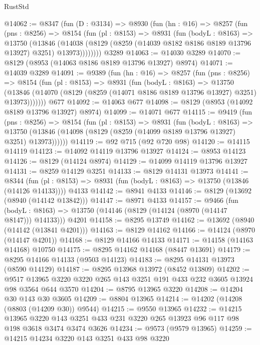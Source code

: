 \begin{lexlean}{RustStd}
\begin{coremodule}
@14062 := @8347
    (fun (D : @3134) =>
    @8930
      (fun (hn : @16) =>
      @8257
        (fun (pns : @8256) =>
        @8154
          (fun (pl : @8153) =>
          @8931
            (fun (bodyL : @8163) =>
            @13750
              (@13846
                (@14038 (@8129 (@8259 (@14039 @8182 @8186 @8189 @13796 @13927) @3251) @13973))))))))
    @3289
@14063 := @14030 @3289
@14070 := @8129 (@8953 (@14063 @8186 @8189 @13796 @13927) @8974)
@14071 := @14039 @3289
@14091 := @9389
    (fun (hn : @16) =>
    @8257
      (fun (pns : @8256) =>
      @8154
        (fun (pl : @8153) =>
        @8931
          (fun (bodyL : @8163) =>
          @13750
            (@13846 (@14070 (@8129 (@8259 (@14071 @8186 @8189 @13796 @13927) @3251) @13973)))))))
    @677
@14092 := @14063 @677
@14098 := @8129 (@8953 (@14092 @8189 @13796 @13927) @8974)
@14099 := @14071 @677
@14115 := @9419
    (fun (pns : @8256) =>
    @8154
      (fun (pl : @8153) =>
      @8931
        (fun (bodyL : @8163) =>
        @13750 (@13846 (@14098 (@8129 (@8259 (@14099 @8189 @13796 @13927) @3251) @13973))))))
@14119 := @92 @715 (@92 @720 @98)
@14120 := @14115 @14119
@14123 := @14092 @14119 @13796 @13927
@14124 := @8953 @14123
@14126 := @8129 (@14124 @8974)
@14129 := @14099 @14119 @13796 @13927
@14131 := @8259 @14129 @3251
@14133 := @8129 @14131 @13973
@14141 := @8344
    (fun (pl : @8153) => @8931 (fun (bodyL : @8163) => @13750 (@13846 (@14126 @14133))))
    @4133
@14142 := @8941 @4133
@14146 := @8129 (@13692 (@8940 (@14142 @13842)))
@14147 := @8971 @4133
@14157 := @9466
    (fun (bodyL : @8163) => @13750 (@14146 (@8129 (@14124 (@8970 (@14147 @8147))) @14133)))
    @4201
@14158 := @8295 @13749
@14162 := @13692 (@8940 (@14142 (@13841 @4201)))
@14163 := @8129 @14162
@14166 := @14124 (@8970 (@14147 @4201))
@14168 := @8129 @14166 @14133
@14171 := @14158 (@14163 @14168) @10750
@14175 := @8295 @14162 @14168 (@8447 @13691)
@14179 := @8295 @14166 @14133 (@9503 @14123)
@14183 := @8295 @14131 @13973 (@8590 @14129)
@14187 := @8295 @13968 @13972 (@8452 @13809)
@14202 := @9517 @13965 @3220 @3220 @265 @143 @3251 @191 @433 @232 @3605 @13924 @98 @3564 @644 @3570
@14204 := @8795 @13965 @3220
@14208 := @14204 @30 @143 @30 @3605
@14209 := @8804 @13965
@14214 := @14202 (@14208 (@8803 (@14209 @30)) @9544)
@14215 := @9550 @13965
@14232 := @14215
    @13965
    @3220
    @143
    @3251
    @433
    @231
    @3220
    @265
    @13923
    @96
    @117
    @98
    @198
    @3618
    @3474
    @3474
    @3626
@14234 := @9573 (@9579 @13965)
@14259 := @14215
    @14234
    @3220
    @143
    @3251
    @433
    @98
    @3220

\end{coremodule}
\end{lexlean}
